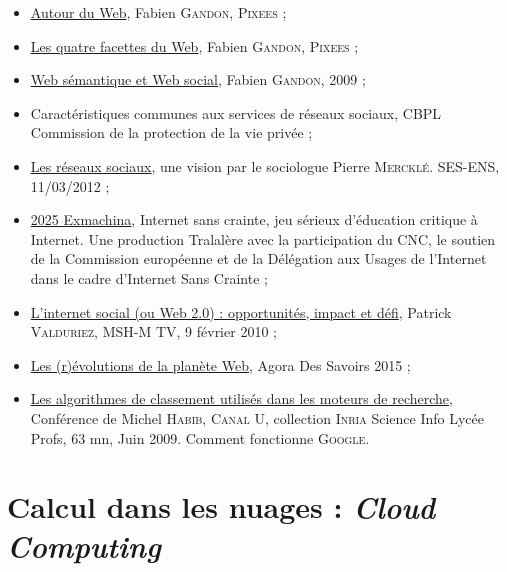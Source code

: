 \begin{gofurther}
\begin{itemize}\jazzitem
\item \href{https://pixees.fr/autour-du-web/}{Autour du Web}, Fabien \textsc{Gandon}, \textsc{Pixees} ;
\item \href{https://pixees.fr/les-quatre-facettes-du-web/}{Les quatre facettes du Web}, Fabien \textsc{Gandon}, \textsc{Pixees} ;
\item \href{https://fr.slideshare.net/fabien_gandon/web-smantique-et-web-social-1700977}{Web sémantique et Web social}, Fabien \textsc{Gandon}, 2009 ;
\item Caractéristiques communes aux services de réseaux sociaux, CBPL Commission de la protection de la vie privée ;
\item \href{http://ses.ens-lyon.fr/articles/les-reseaux-sociaux-138014}{Les réseaux sociaux}, une vision par le sociologue Pierre \textsc{Mercklé}. SES-ENS,  11/03/2012 ;
\item \href{https://www.internetsanscrainte.fr/programmes/vinz-et-lou}{2025 Exmachina}, Internet sans crainte, jeu sérieux d'éducation critique à Internet. Une production Tralalère avec la participation du CNC, le soutien de la Commission européenne et de la Délégation aux Usages de l’Internet dans le cadre d’Internet Sans Crainte ;
\item \href{http://www.mshsud.tv/spip.php?article214}{L’internet social (ou Web 2.0) : opportunités, impact et défi}, Patrick \textsc{Valduriez}, MSH-M TV,  9 février 2010 ;
\item \href{https://www.youtube.com/watch?v=jNjHdqS-1Ko}{Les (r)évolutions de la planète Web}, Agora Des Savoirs 2015 ;
\item \href{https://www.canal-u.tv/video/inria/les_algorithmes_de_classement_utilises_dans_les_moteurs_de_recherche.6608}{Les algorithmes de classement utilisés dans les moteurs de recherche}, Conférence de Michel \textsc{Habib}, \textsc{Canal U}, collection \textsc{Inria} Science Info Lycée Profs, 63 mn, Juin 2009.  Comment fonctionne \textsc{Google}.
\end{itemize}
\end{gofurther}


\section[Calcul dans les nuages]{Calcul dans les nuages : \textit{Cloud Computing}}
\label{sec:II.2}

